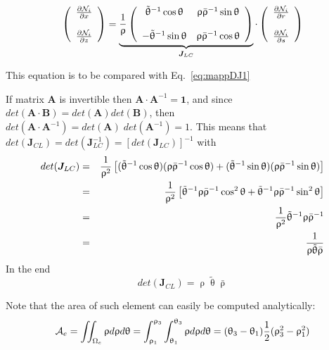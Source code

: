 \begin{mdframed}[backgroundcolor=blue!5]
\begin{equation}
\left(
\begin{array}{c}
\frac{\partial {\mathcal{N}}_i}{\partial x} \\ \\
\frac{\partial {\mathcal{N}}_i}{\partial z} 
\end{array}
\right)
=
\underbrace{
\frac{1}{\uprho}
\left(
\begin{array}{cc}
\tilde{\uptheta}^{-1} \cos\uptheta & \uprho \bar{\uprho}^{-1} \sin \uptheta\\ \\
-\tilde{\uptheta}^{-1} \sin\uptheta & \uprho \bar{\uprho}^{-1} \cos \uptheta
\end{array}
\right)
}_{{\bm J}_{LC}}
\cdot 
\left(
\begin{array}{c}
\frac{\partial {\mathcal{N}}_i}{\partial r} \\ \\
\frac{\partial {\mathcal{N}}_i}{\partial s} 
\end{array}
\right)  
\end{equation}
\end{mdframed}
This equation is to be compared with Eq.~\eqref{eq:mappDJ1}


If matrix ${\bm A}$ is invertible then ${\bm A}\cdot {\bm A}^{-1}={\bm 1}$,
and since $det({\bm A}\cdot {\bm B}) = det({\bm A}) det ({\bm B})$, then
$det({\bm A}\cdot {\bm A}^{-1})= det({\bm A})\; det ({\bm A}^{-1}) =1$.
This means that
$
det({\bm J}_{CL})=
det({\bm J}_{LC}^{-1})=
[det({\bm J}_{LC})]^{-1}
$
with
\begin{eqnarray}
det({\bm J}_{LC})
&=&
\frac{1}{\uprho^2}
\left[
(\tilde{\uptheta}^{-1} \cos\uptheta )
( \uprho \bar{\uprho}^{-1} \cos \uptheta)+ 
(\tilde{\uptheta}^{-1} \sin\uptheta) 
(\uprho \bar{\uprho}^{-1} \sin \uptheta) \right] \nonumber\\
&=&
\frac{1}{\uprho^2}
\left[
\tilde{\uptheta}^{-1} 
 \uprho \bar{\uprho}^{-1} \cos^2 \uptheta+ 
\tilde{\uptheta}^{-1}  
\uprho \bar{\uprho}^{-1} \sin^2 \uptheta \right] \nonumber\\
&=&
\frac{1}{\uprho^2}
\tilde{\uptheta}^{-1} \uprho \bar{\uprho}^{-1} \nonumber\\
&=&
\frac{1}{\uprho \tilde{\uptheta}  \bar{\uprho}}
\end{eqnarray}
In the end
\[
det({\bm J}_{CL})=  \uprho \tilde{\uptheta}  \bar{\uprho}
\]



Note that the area of such element can easily be computed analytically:
\[
{\cal A}_e 
= \iint_{\Omega_e} \uprho d\uprho d\uptheta 
= \int_{\uprho_1}^{\uprho_3}\int_{\uptheta_1}^{\uptheta_3} \uprho d\uprho d\uptheta 
= (\uptheta_3-\uptheta_1) \frac12 (\uprho_3^2-\uprho_1^2)
\]


